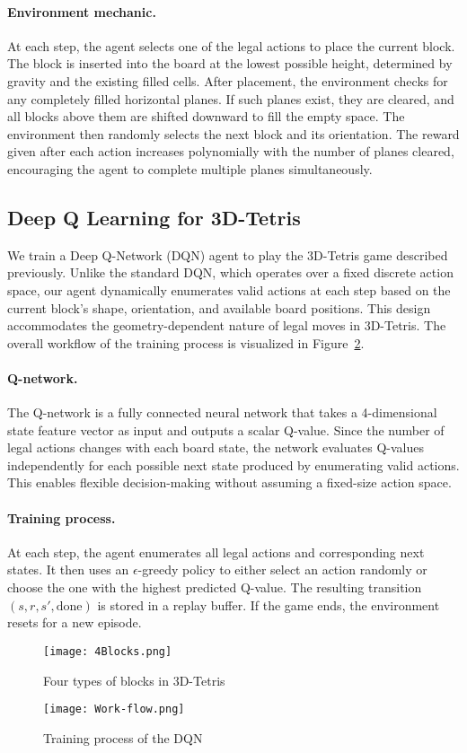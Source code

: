 \paragraph{Environment mechanic.}
At each step, the agent selects one of the legal actions to place the current block. The block is inserted into the board at the lowest possible height, determined by gravity and the existing filled cells. After placement, the environment checks for any completely filled horizontal planes. If such planes exist, they are cleared, and all blocks above them are shifted downward to fill the empty space. The environment then randomly selects the next block and its orientation. The reward given after each action increases polynomially with the number of planes cleared, encouraging the agent to complete multiple planes simultaneously.

\subsection{Deep Q Learning for 3D-Tetris}
We train a Deep Q-Network (DQN) agent to play the 3D-Tetris game described previously. Unlike the standard DQN, which operates over a fixed discrete action space, our agent dynamically enumerates valid actions at each step based on the current block's shape, orientation, and available board positions. This design accommodates the geometry-dependent nature of legal moves in 3D-Tetris. The overall workflow of the training process is visualized in Figure~\ref{fig:Workflow}.

\paragraph{Q-network.}
The Q-network is a fully connected neural network that takes a 4-dimensional state feature vector as input and outputs a scalar Q-value. Since the number of legal actions changes with each board state, the network evaluates Q-values independently for each possible next state produced by enumerating valid actions. This enables flexible decision-making without assuming a fixed-size action space.

\paragraph{Training process.}
At each step, the agent enumerates all legal actions and corresponding next states. It then uses an $\epsilon$-greedy policy to either select an action randomly or choose the one with the highest predicted Q-value. The resulting transition $(s, r, s', \text{done})$ is stored in a replay buffer. If the game ends, the environment resets for a new episode.

\begin{figure}
    \centering
    \texttt{[image: 4Blocks.png]}
    \caption{Four types of blocks in 3D-Tetris}
    \label{fig:4Blocks}
\end{figure}

\begin{figure}
    \centering
    \texttt{[image: Work-flow.png]}
    \caption{Training process of the DQN}
    \label{fig:Workflow}
\end{figure}
